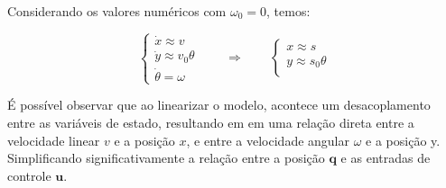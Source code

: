 Considerando os valores numéricos com $\omega_0 = 0$, temos:

\begin{equation}
\begin{cases}
\dot{x} \approx v \\
\dot{y} \approx v_0 \theta \\
\dot{\theta} = \omega
\end{cases}
\qquad
\Rightarrow
\qquad
\begin{cases}
x \approx s \\
y \approx s_0 \theta \\
\end{cases}
\label{eq:linearized_model}
\end{equation}

É possível observar que ao linearizar o modelo, 
acontece um desacoplamento entre as variáveis de estado,
resultando em em uma relação direta entre a velocidade linear $v$ e a posição $x$,
e entre a velocidade angular $\omega$ e a posição y. Simplificando significativamente
 a relação entre a posição $\mathbf{q}$
e as entradas de controle $\mathbf{u}$.